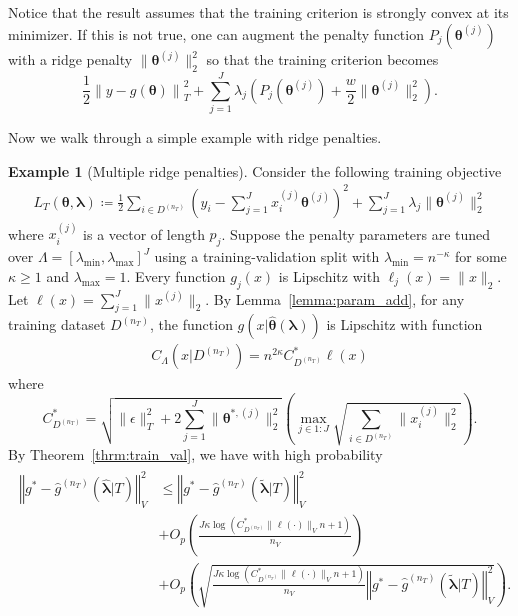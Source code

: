 \documentclass[12pt]{article} %
\theoremstyle{definition}
\newtheorem{example}{Example}
\begin{document}
Notice that the result assumes that the training criterion is strongly convex at its minimizer. If this is not true, one can augment the penalty function $P_j(\boldsymbol{\theta}^{(j)})$ with a ridge penalty $\| \boldsymbol{\theta}^{(j)} \|_2^2$ so that the training criterion becomes
\begin{equation}
\label{eq:param_add_models_ridge}
\frac{1}{2} \left  \| y -  g(\boldsymbol{\theta}) \right \|^2_T 
+ \sum_{j=1}^J \lambda_j \left ( P_j(\boldsymbol{\theta}^{(j)}) + \frac{w}{2} \| \boldsymbol{\theta}^{(j)} \|^2_2 \right ).
\end{equation}

Now we walk through a simple example with ridge penalties.
\begin{example}[Multiple ridge penalties]
	Consider the following training objective
	\begin{align}
	L_T \left (\boldsymbol{\theta}, \boldsymbol{\lambda} \right) 
	\coloneqq 
	\frac{1}{2}
	\sum_{i\in D^{(n_T)}}
	\left(y_i -  \sum_{j=1}^J x_{i}^{(j)} \boldsymbol{\theta}^{(j)} \right )^2
	+ \sum_{j=1}^J \lambda_j \|\boldsymbol{\theta}^{(j)}\|_2^2
	\end{align}
	where $x_{i}^{(j)}$ is a vector of length $p_j$.
	Suppose the penalty parameters are tuned over $\Lambda = \left [ \lambda_{\min}, \lambda_{\max} \right ]^J$ using a training-validation split with $\lambda_{\min} = n^{-\kappa}$ for some $\kappa \ge 1$ and $\lambda_{\max} = 1$.
	Every function $g_j(x)$ is Lipschitz with $\ell_j(x) = \|x\|_2$.
	Let $\ell(x) = \sum_{j=1}^J \|x^{(j)}\|_2$.
	By Lemma~\ref{lemma:param_add}, for any training dataset $D^{(n_T)}$, the function $g(x | \hat{\boldsymbol{\theta}}(\boldsymbol{\lambda}))$ is Lipschitz with function
	\begin{align}
	C_\Lambda \left ( x | D^{(n_T)} \right ) =
	n^{2\kappa}
	C^*_{D^{(n_T)}}
	\ell(x)
	\end{align}
	where $$
	C^*_{D^{(n_T)}} = 
	\sqrt{\|\epsilon\|_{T}^{2}
	+2\sum_{j=1}^J \|\boldsymbol{\theta}^{*,(j)}\|_2^2}
	\left(
	\max_{j \in 1:J} \sqrt{\sum_{i \in D^{(n_T)}} \|x_i^{(j)} \|_2^2}
	\right).$$
	By Theorem~\ref{thrm:train_val}, we have with high probability
	\begin{align}
	\begin{split}
	\left\Vert g^* - \hat{g}^{(n_T)}( \hat{\boldsymbol{\lambda}} | T) \right\Vert _{V}^2
	&\le \left\Vert g^* - \hat{g}^{(n_T)}( \tilde{\boldsymbol{\lambda}} | T) \right \Vert^2_{V}\\
	& + O_p\left (
	\frac{J \kappa \log(C^*_{D^{(n_T)}} \|\ell(\cdot)\|_V n + 1)}{n_{V}}
	\right ) \\
	& + O_p\left(
	\sqrt{\frac{J \kappa \log(C^*_{D^{(n_T)}} \|\ell(\cdot)\|_V n + 1)}{n_{V}}\left\Vert g^* - \hat{g}^{(n_T)}( \tilde{\boldsymbol{\lambda}} | T)\right\Vert_{V}^2}
	\right ).
	\end{split}
	\end{align}
\end{example}
\end{document}
